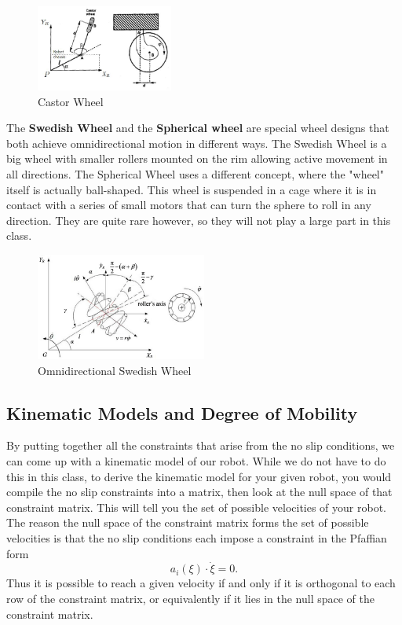 \documentclass[twoside]{article}
\begin{document}
\begin{figure}[h]
\centering
\includegraphics[width=0.4\textwidth]{cast}
\caption{Castor Wheel}
\end{figure}

The \textbf{Swedish Wheel} and the \textbf{Spherical wheel} are special wheel designs that both achieve omnidirectional motion in different ways. The Swedish Wheel is a big wheel with smaller rollers mounted on the rim allowing active movement in all directions\cite{sns}. The Spherical Wheel uses a different concept, where the "wheel" itself is actually ball-shaped. This wheel is suspended in a cage where it is in contact with a series of small motors that can turn the sphere to roll in any direction. They are quite rare however, so they will not play a large part in this class.

\begin{figure}[H]
\centering
\includegraphics[width=0.5\textwidth]{swedish}
\caption{Omnidirectional Swedish Wheel \cite{swed}}
\end{figure}

\subsection*{Kinematic Models and Degree of Mobility}

By putting together all the constraints that arise from the no slip conditions, we can come up with a kinematic model of our robot. While we do not have to do this in this class, to derive the kinematic model for your given robot, you would compile the no slip constraints into a matrix, then look at the null space of that constraint matrix. This will tell you the set of possible velocities of your robot. The reason the null space of the constraint matrix forms the set of possible velocities is that the no slip conditions each impose a constraint in the Pfaffian form $$a_i(\xi) \cdot \dot{\xi} = 0.$$ Thus it is possible to reach a given velocity if and only if it is orthogonal to each row of the constraint matrix, or equivalently if it lies in the null space of the constraint matrix.
\end{document}
